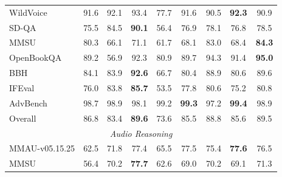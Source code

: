 \begin{table}[H]
{\begin{tabular}{@{}lcccccccc@{}}
WildVoice      & 91.6 & 92.1 & 93.4          & 77.7 & 91.6          & 90.5 & \textbf{92.3} & 90.9          \\
SD-QA          & 75.5 & 84.5 & \textbf{90.1} & 56.4 & 76.9          & 78.1 & 76.8          & 78.5          \\
MMSU           & 80.3 & 66.1 & 71.1          & 61.7 & 68.1          & 83.0 & 68.4          & \textbf{84.3} \\
OpenBookQA     & 89.2 & 56.9 & 92.3          & 80.9 & 89.7          & 94.3 & 91.4          & \textbf{95.0} \\
BBH            & 84.1 & 83.9 & \textbf{92.6} & 66.7 & 80.4          & 88.9 & 80.6          & 89.6          \\
IFEval         & 76.0 & 83.8 & \textbf{85.7} & 53.5 & 77.8          & 80.6 & 75.2          & 80.8          \\
AdvBench       & 98.7 & 98.9 & 98.1          & 99.2 & \textbf{99.3} & 97.2 & \textbf{99.4} & 98.9          \\
Overall        & 86.8 & 83.4 & \textbf{89.6} & 73.6 & 85.5          & 88.8 & 85.6          & 89.5          \\ \midrule
\multicolumn{9}{c}{\textit{Audio Reasoning}}                                                                        \\ \midrule
MMAU-v05.15.25 & 62.5 & 71.8 & 77.4          & 65.5 & 77.5          & 75.4 & \textbf{77.6} & 76.5          \\
MMSU           & 56.4 & 70.2 & \textbf{77.7} & 62.6 & 69.0          & 70.2 & 69.1          & 71.3          \\ \bottomrule
\end{tabular}%
}
\end{table}